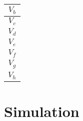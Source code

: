 \documentclass[11pt]{article}
\begin{document}
\begin{center}
    \begin{minipage}{.3\textwidth}
        \flushright
        \begin{tabular}{|c|}
            \hline
            $V_b$ \\
            \hline
            $V_c$ \\
            \hline
            $V_d$ \\
            \hline
            $V_e$ \\
            \hline
            $V_f$ \\
            \hline
            $V_g$ \\
            \hline
            $V_h$ \\
            \hline
        \end{tabular}
    \end{minipage}
    \begin{minipage}{.3\textwidth}
        \flushleft
        
    \end{minipage}
\end{center}

\section{Simulation}

\begin{center}
	\begin{tabular}{|c|c|}
		\hline
		
	\end{tabular}
\end{center}
\end{document}
